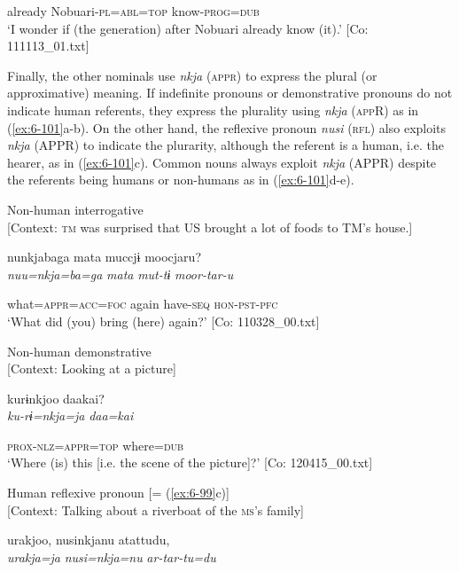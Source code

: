 \begin{table}
      already  Nobuari-\textsc{pl}=\textsc{abl}=\textsc{top}  know-\textsc{prog}=\textsc{dub}\\
\glt ‘I wonder if (the generation) after Nobuari already know (it).’ [Co: 111113\_01.txt]
\z

  Finally, the other nominals use \textit{nkja} (\textsc{appr}) to express the plural (or approximative) meaning. If indefinite pronouns or demonstrative pronouns do not indicate human referents, they express the plurality using \textit{nkja} (\textsc{app}R) as in (\ref{ex:6-101}a-b). On the other hand, the reflexive pronoun \textit{nusi} (\textsc{rfl}) also exploits \textit{nkja} (APPR) to indicate the plurarity, although the referent is a human, i.e. the hearer, as in (\ref{ex:6-101}c). Common nouns always exploit \textit{nkja} (APPR) despite the referents being humans or non-humans as in (\ref{ex:6-101}d-e).

\ea\label{ex:6-101}
 \ea Non-human interrogative\\{}
[Context: \textsc{tm} was surprised that US brought a lot of foods to TM’s house.]

{\TM}
\glll nunkjabaga  mata  muccjɨ  moocjaru?\\

      \textit{nuu=nkja=ba=ga}  \textit{mata}  \textit{mut-tɨ}  \textit{moor-tar-u}

      what=\textsc{appr}=\textsc{acc}=\textsc{foc}  again  have-\textsc{seq}  \textsc{hon}-\textsc{pst}-\textsc{pfc}\\
\glt ‘What did (you) bring (here) again?’ [Co: 110328\_00.txt]
\z

\ex Non-human demonstrative\\{}
[Context: Looking at a picture]

{\TM}
\glll kurɨnkjoo  daakai?\\

      \textit{ku-rɨ=nkja=ja}  \textit{daa=kai}

      \textsc{prox}-\textsc{nlz}=\textsc{appr}=\textsc{top}  where=\textsc{dub}\\
\glt ‘Where (is) this [i.e. the scene of the picture]?’ [Co: 120415\_00.txt]
\z

\ex Human reflexive pronoun [= (\ref{ex:6-99}c)]\\{}
[Context: Talking about a riverboat of the \textsc{ms}’s family]

{\TM}
\glll urakjoo,  nusinkjanu  atattudu,\\

      \textit{urakja=ja}  \textit{nusi=nkja=nu}  \textit{ar-tar-tu=du}


\end{table}
